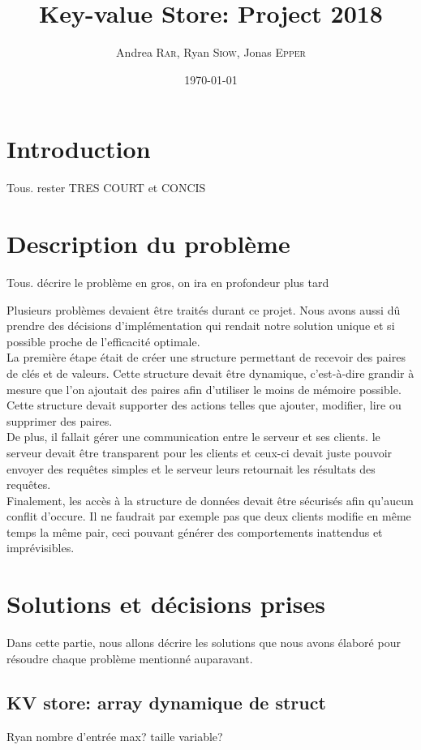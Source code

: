 \documentclass[12pt,a4paper]{article}
\title{\vspace{-10em}Key-value Store: Project 2018}
\date{\today}
\author{Andrea \textsc{Rar}, Ryan \textsc{Siow}, Jonas \textsc{Epper}}
\newcommand{\emailurl}[1]{\href{mailto:#1}{#1}}
\renewcommand\maketitle{
\begin{center}%
    {\LARGE \thetitle \vspace \baselineskip \par}%
    {\large \theauthor \vspace \baselineskip \par}%
\myaddress
\emailurl{\myemail}
\end{center}
}
\begin{document}
\maketitle
\thispagestyle{empty}

\renewcommand{\contentsname}{\large Table des matières}
\renewcommand{\baselinestretch}{0.75}\normalsize
\tableofcontents %

\section{Introduction}
Tous. rester TRES COURT et CONCIS

\section{Description du problème}
Tous. décrire le problème en gros, on ira en profondeur plus tard

Plusieurs problèmes devaient être traités durant ce projet. Nous avons aussi dû prendre des décisions d'implémentation qui rendait notre solution unique et si possible proche de l'efficacité optimale.\\
La première étape était de créer une structure permettant de recevoir des paires de clés et de valeurs. Cette structure devait être dynamique, c'est-à-dire grandir à mesure que l'on ajoutait des paires afin d'utiliser le moins de mémoire possible. Cette structure devait supporter des actions telles que ajouter, modifier, lire ou supprimer des paires.\\
De plus, il fallait gérer une communication entre le serveur et ses clients. le serveur devait être transparent pour les clients et ceux-ci devait juste pouvoir envoyer des requêtes simples et le serveur leurs retournait les résultats des requêtes. \\
Finalement, les accès à la structure de données devait être sécurisés afin qu'aucun conflit d'occure. Il ne faudrait par exemple pas que deux clients modifie en même temps la même pair, ceci pouvant générer des comportements inattendus et imprévisibles. 
\section{Solutions et décisions prises}
Dans cette partie, nous allons décrire les solutions que nous avons élaboré pour résoudre chaque problème mentionné auparavant. 
\subsection{KV store: array dynamique de struct}
Ryan
nombre d'entrée max? taille variable? 
\end{document}
